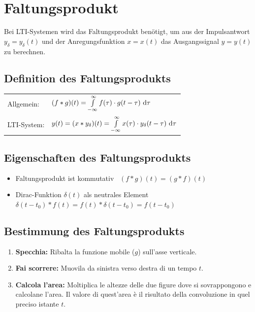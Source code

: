 \section{Faltungsprodukt}

Bei LTI-Systemen wird das Faltungsprodukt benötigt, um aus der Impulsantwort  $y_{\delta} = y_{\delta}(t)$ und der Anregungsfunktion 
$x = x(t)$ das Ausgangssignal $y = y(t)$ zu berechnen.


\subsection{Definition des Faltungsprodukts}

\renewcommand{\arraystretch}{2}
\begin{tabular}{ll}
    Allgemein:  & $ (f * g)(t) = \int\limits_{-\infty}^{\infty} f(\tau) \cdot g(t - \tau) \, \mathop{} \! \mathrm{d} \tau$                            \\
    LTI-System: & $y(t) = (x * y_{\delta} )(t) = \int \limits_{-\infty}^{\infty} x(\tau) \cdot y_{\delta}(t - \tau) \, \mathop{} \! \mathrm{d} \tau $ 
\end{tabular}
\renewcommand{\arraystretch}{1}


\subsection{Eigenschaften des Faltungsprodukts} 

\begin{itemize}
    \item Faltungsprodukt ist kommutativ \textrightarrow\ $(f * g)(t) = (g * f)(t)$
    \item Dirac-Funktion $\delta(t)$ als neutrales Element \\   
        $\delta(t - t_0) * f(t) = f(t) * \delta(t - t_0) = f(t - t_0)$
\end{itemize}


\subsection{Bestimmung des Faltungsprodukts}

\begin{enumerate}
    \item \textbf{Specchia:} Ribalta la funzione mobile ($g$) sull'asse verticale.
    \item \textbf{Fai scorrere:} Muovila da sinistra verso destra di un tempo $t$.
    \item \textbf{Calcola l'area:} Moltiplica le altezze delle due figure dove si sovrappongono e calcolane l'area. Il valore di quest'area è il risultato della convoluzione in quel preciso istante $t$.
\end{enumerate}

